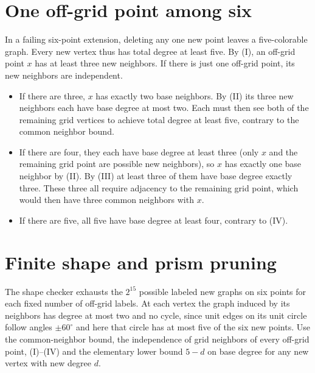 \documentclass[11pt,letterpaper]{article}
\begin{document}
\section{One off-grid point among
six}\label{one-off-grid-point-among-six}

In a failing six-point extension, deleting any one new point leaves a
five-colorable graph. Every new vertex thus has total degree at least
five. By (I), an off-grid point \(x\) has at least three new neighbors.
If there is just one off-grid point, its new neighbors are independent.
\begin{itemize}
\item If there are three, \(x\) has exactly two base neighbors. By (II) its
three new neighbors each have base degree at most two. Each must then
see both of the remaining grid vertices to achieve total degree at least
five, contrary to the common neighbor bound.
\item If there are four, they
each have base degree at least three (only \(x\) and the remaining grid
point are possible new neighbors), so \(x\) has exactly one base
neighbor by (II). By (III) at least three of them have base degree
exactly three. These three all require adjacency to the remaining grid
point, which would then have three common neighbors with \(x\).
\item If there are five, all five have base degree at least four, contrary to
(IV).
\end{itemize}

\section{Finite shape and prism
pruning}\label{finite-shape-and-prism-pruning}

The shape checker exhausts the \(2^{15}\) possible labeled new graphs on
six points for each fixed number of off-grid labels. At each vertex the
graph induced by its neighbors has degree at most two and no cycle,
since unit edges on its unit circle follow angles \(\pm60^\circ\) and
here that circle has at most five of the six new points. Use the
common-neighbor bound, the independence of grid neighbors of every
off-grid point, (I)--(IV) and the elementary lower bound \(5-d\) on base
degree for any new vertex with new degree \(d\).
\end{document}
